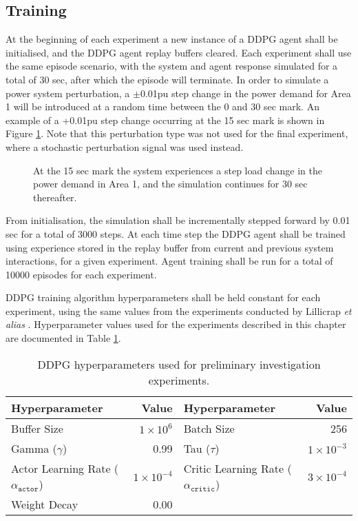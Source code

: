 \subsection{Training}\label{ssec:training}
At the beginning of each experiment a new instance of a DDPG agent shall be initialised, and the DDPG agent replay buffers cleared. Each experiment shall use the same episode scenario, with the system and agent response simulated for a total of 30 sec, after which the episode will terminate. In order to simulate a power system perturbation, a $\pm$0.01pu step change in the power demand for Area 1 will be introduced at a random time between the 0 and 30 sec mark. An example of a +0.01pu step change occurring at the 15 sec mark is shown in Figure \ref{fig:5001_demand_profile}. Note that this perturbation type was not used for the final experiment, where a stochastic perturbation signal was used instead.

\begin{figure}[h]
	\centering
	
	\caption[Preliminary investigation load demand step change]{At the 15 sec mark the system experiences a step load change in the power demand in Area 1, and the simulation continues for 30 sec thereafter.}
	\label{fig:5001_demand_profile}
\end{figure}

From initialisation, the simulation shall be incrementally stepped forward by 0.01 sec for a total of 3000 steps. At each time step the DDPG agent shall be trained using experience stored in the replay buffer from current and previous system interactions, for a given experiment. Agent training shall be run for a total of 10000 episodes for each experiment.

DDPG training algorithm hyperparameters shall be held constant for each experiment, using the same values from the experiments conducted by Lillicrap \textit{et alias} \cite{Lillicrap2015}. Hyperparameter values used for the experiments described in this chapter are documented in Table \ref{tab:5000_hyperparameters}.

\begin{table}[h]
	\centering
	\caption{DDPG hyperparameters used for preliminary investigation experiments.}
	\begin{tabular}{lrlr}
	\toprule
	\textbf{Hyperparameter} & \textbf{Value} & \textbf{Hyperparameter} & \textbf{Value} \\
	\midrule
	Buffer Size 	 & $1 \times 10^6$  & Batch Size 	& 256 \\
	Gamma ($\gamma$) & 0.99 	& Tau ($\tau$) 	& $1 \times 10^{-3}$ \\
	Actor Learning Rate ($\alpha_{\texttt{actor}}$) & $1 \times 10^{-4}$ & Critic Learning Rate ($\alpha_{\texttt{critic}}$) & $3 \times 10^{-4} $ \\
	Weight Decay & 0.00 & & \\
	\bottomrule
	\end{tabular}\label{tab:5000_hyperparameters}
\end{table}

